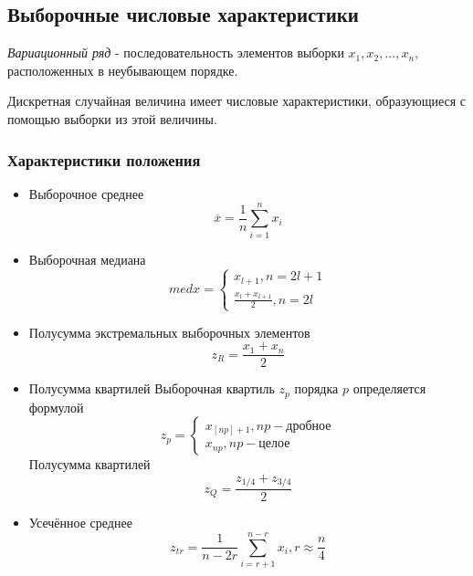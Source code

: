 \documentclass[12pt,a4paper]{article}
\begin{document}
\subsection{Выборочные числовые характеристики}
\textit{Вариационный ряд} - последовательность элементов выборки $x_1,x_2,...,x_n$, расположенных в неубывающем порядке.

Дискретная случайная величина имеет числовые характеристики, образующиеся с помощью выборки из этой величины.
\subsubsection{Характеристики положения}
\begin{itemize}
    \item Выборочное среднее
        \begin{equation}
            \overline{x}=\frac{1}{n}\sum_{i=1}^{n}{x_i}
		\end{equation}
	\item Выборочная медиана
	    \begin{equation}
			med x=
			\begin{cases}
			    x_{l+1},n=2l+1\\
				\frac{x_l+x_{l+1}}{2},n=2l
			\end{cases}
		\end{equation}
	\item Полусумма экстремальных выборочных элементов
	    \begin{equation}
			z_R=\frac{x_1 + x_n}{2}
		\end{equation}
	\item Полусумма квартилей
	    \newline Выборочная квартиль $z_p$ порядка $p$ определяется формулой
	    \begin{equation}
		    z_p =
			\begin{cases}
			    x_{[np]+1},np-\text{дробное}\\
		      	x_{np},np-\text{целое}
	        \end{cases}
		\end{equation}
	    Полусумма квартилей
	    \begin{equation}
			z_Q=\frac{z_{1/4}+z_{3/4}}{2}
		\end{equation}
	\item Усечённое среднее
	    \begin{equation}
			z_{tr}=\frac{1}{n-2r}\sum_{i=r+1}^{n-r}{x_i}, r\approx\frac{n}{4}
		\end{equation}
\end{itemize}
\end{document}
